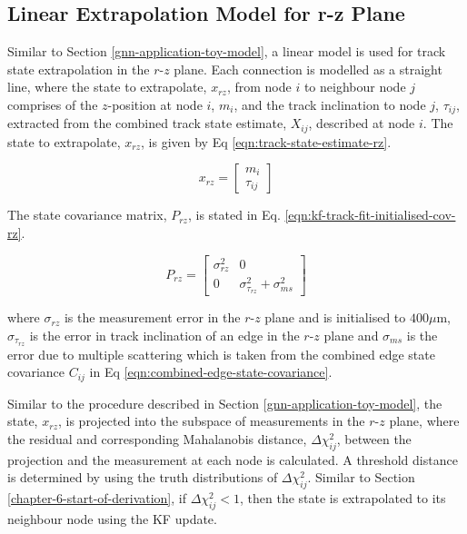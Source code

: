 \subsection{Linear Extrapolation Model for r-z Plane}
\label{chapter-6-r-z-plane-impl}


Similar to Section \ref{gnn-application-toy-model}, a linear model is used for track state extrapolation in the $r$-$z$ plane. Each connection is modelled as a straight line, where the state to extrapolate, $x_{rz}$, from node $i$ to neighbour node $j$ comprises of the $z$-position at node $i$, $m_i$, and the track inclination to node $j$, $\tau_{ij}$, extracted from the combined track state estimate, $X_{ij}$, described at node $i$. The state to extrapolate, $x_{rz}$, is given by Eq \eqref{eqn:track-state-estimate-rz}.

\begin{equation}
x_{rz} = \begin{bmatrix} m_i \\ \tau_{ij} \end{bmatrix}
\label{eqn:track-state-estimate-rz}
\end{equation}


The state covariance matrix, $P_{rz}$, is stated in Eq. \eqref{eqn:kf-track-fit-initialised-cov-rz}.  

\begin{equation}
P_{rz} = \begin{bmatrix} \sigma_{rz}^2 & 0 \\ 0 & \sigma_{\tau_{rz}}^2 + \sigma_{ms}^2 \end{bmatrix} 
\label{eqn:kf-track-fit-initialised-cov-rz}
\end{equation}

where $\sigma_{rz}$ is the measurement error in the $r$-$z$ plane and is initialised to $400\mu$m, $\sigma_{\tau_{rz}}$ is the error in track inclination of an edge in the $r$-$z$ plane and $\sigma_{ms}$ is the error due to multiple scattering which is taken from the combined edge state covariance $C_{ij}$ in Eq \eqref{eqn:combined-edge-state-covariance}.

Similar to the procedure described in Section \ref{gnn-application-toy-model}, the state, $x_{rz}$, is projected into the subspace of measurements in the $r$-$z$ plane, where the residual and corresponding Mahalanobis distance, $\Delta \chi_{ij}^{2}$, between the projection and the measurement at each node is calculated. A threshold distance is determined by using the truth distributions of $\Delta \chi_{ij}^{2}$. Similar to Section \ref{chapter-6-start-of-derivation}, if $\Delta \chi_{ij}^{2} < 1$, then the state is extrapolated to its neighbour node using the KF update.



